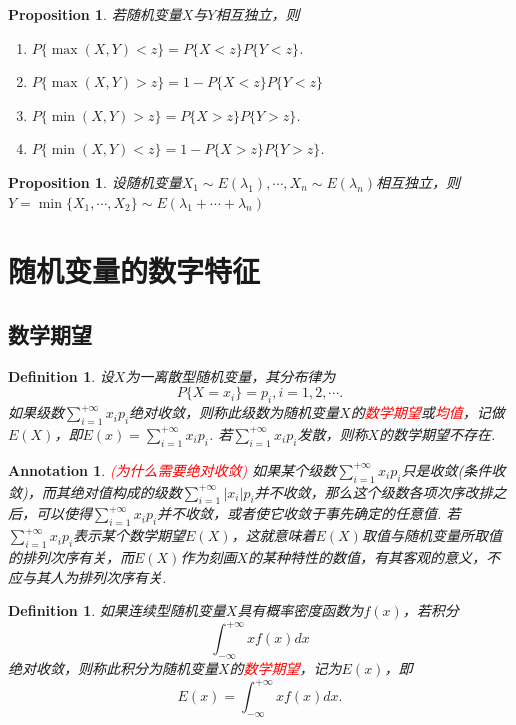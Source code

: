 \documentclass{article}
\newtheorem{proposition}[theorem]{Proposition}
\newtheorem{definition}[theorem]{Definition}
\newtheorem{annotation}[theorem]{Annotation}
\newcommand{\redt}[1]{\textcolor{red}{#1}}
\begin{document}
\begin{proposition}
\rm 若随机变量$X$与$Y$相互独立，则
\begin{enumerate}
	\item $P\{\max(X,Y) < z\} = P\{X < z\}P\{Y < z\}$.
	\item $P\{\max(X,Y) > z\} = 1-  P\{X < z\}P\{Y < z\}$
	\item $P\{\min(X,Y) > z\} = P\{X>z\}P\{Y>z\}$.  
	\item $P\{\min(X,Y) < z\} = 1-P\{X>z\}P\{Y>z\}$.
\end{enumerate}
\end{proposition}

\begin{proposition}
\rm 设随机变量$X_1 \sim E(\lambda_1),\cdots,X_n \sim E(\lambda_n)$相互独立，则$Y = \min\{X_1,\cdots,X_2\} \sim E(\lambda_1 +\cdots +\lambda_n)$
\end{proposition}

\newpage
\section{随机变量的数字特征}

\subsection{数学期望}

\begin{definition}
\rm 设$X$为一离散型随机变量，其分布律为
$$
P\{X=x_i\} = p_i, i= 1,2,\cdots.
$$
如果级数$\sum\limits_{i=1}^{+\infty}x_ip_i$绝对收敛，则称此级数为随机变量$X$的\redt{数学期望}或\redt{均值}，记做$E(X)$，即$E(x) = \sum\limits_{i=1}^{+\infty}x_ip_i$. 若$\sum\limits_{i=1}^{+\infty}x_ip_i$发散，则称$X$的数学期望不存在. 
\end{definition}

\begin{annotation}
\rm \redt{(为什么需要绝对收敛)} 如果某个级数$\sum\limits_{i=1}^{+\infty}x_ip_i$只是收敛(条件收敛)，而其绝对值构成的级数$\sum\limits_{i=1}^{+\infty}|x_i|p_i$并不收敛，那么这个级数各项次序改排之后，可以使得$\sum\limits_{i=1}^{+\infty}x_ip_i$并不收敛，或者使它收敛于事先确定的任意值. 若$\sum\limits_{i=1}^{+\infty}x_ip_i$表示某个数学期望$E(X)$，这就意味着$E(X)$取值与随机变量所取值的排列次序有关，而$E(X)$作为刻画$X$的某种特性的数值，有其客观的意义，不应与其人为排列次序有关.
\end{annotation}

\begin{definition}
\rm 如果连续型随机变量$X$具有概率密度函数为$f(x)$，若积分
$$
\int_{-\infty}^{+\infty} xf(x)dx
$$
绝对收敛，则称此积分为随机变量$X$的\redt{数学期望}，记为$E(x)$，即
$$
E(x) = \int_{-\infty}^{+\infty} xf(x)dx. 
$$
\end{definition}
\end{document}
